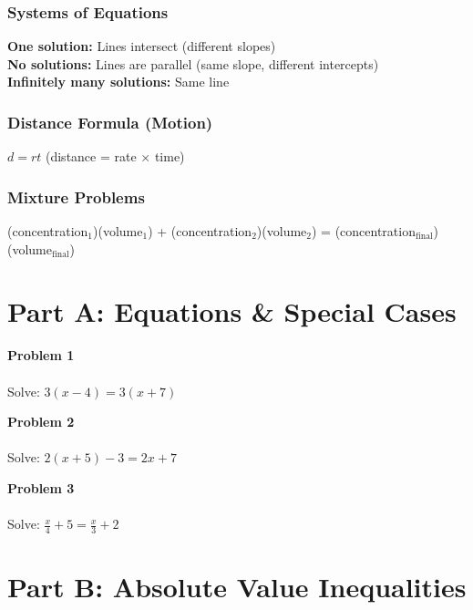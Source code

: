 \documentclass[12pt]{article}
\begin{document}
	        \subsubsection*{Systems of Equations}
	    		\textbf{One solution:} Lines intersect (different slopes) \\
                \textbf{No solutions:} Lines are parallel (same slope, different intercepts) \\
                \textbf{Infinitely many solutions:} Same line

            \subsubsection*{Distance Formula (Motion)}
                $d = rt$ \quad (distance = rate $\times$ time)

            \subsubsection*{Mixture Problems}
                (concentration$_1$)(volume$_1$) + (concentration$_2$)(volume$_2$) = (concentration$_{\text{final}}$)(volume$_{\text{final}}$)

            \newpage
	
        \section*{Part A: Equations \& Special Cases}

            \textbf{Problem 1}\\\\
            Solve: $3(x - 4) = 3(x + 7)$

            \vspace{4cm}

            \textbf{Problem 2}\\\\
            Solve: $2(x + 5) - 3 = 2x + 7$

            \vspace{4cm}

            \textbf{Problem 3}\\\\
            Solve: $\displaystyle\frac{x}{4} + 5 = \frac{x}{3} + 2$

            \newpage

        \section*{Part B: Absolute Value Inequalities}
\end{document}
